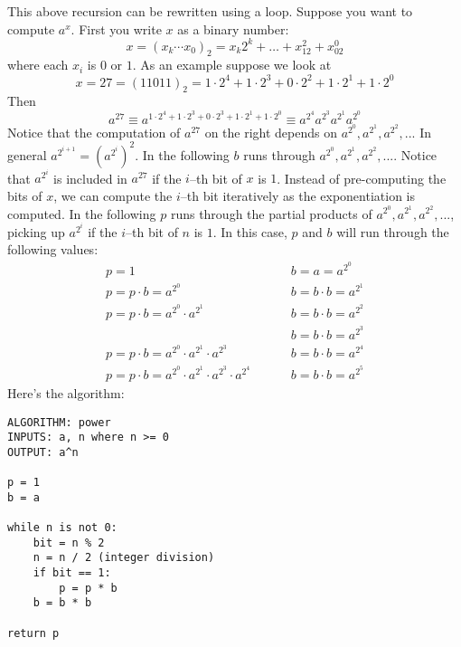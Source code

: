 This above recursion can be rewritten using a loop.
Suppose you want to compute $a^x$.
First you write $x$ as a binary number:
\[
x = (x_k\cdots x_0)_2 = x_k 2^k + \ldots + x_12^2 + x_02^0
\]
where each $x_i$ is $0$ or $1$.
As an example suppose we look at
\[
x = 27 = (11011)_2 =  1 \cdot 2^4 + 1 \cdot 2^3 + 0 \cdot 2^2 + 1 \cdot 2^1 + 1 \cdot 2^0
\]
Then
\[
a^{27} \equiv a^{1 \cdot 2^4 + 1 \cdot 2^3 + 0 \cdot 2^3 + 1 \cdot 2^1 + 1 \cdot 2^0} \equiv a^{2^4}a^{2^3}a^{2^1}a^{2^0}
\]
Notice that the computation of $a^{27}$ on the right
depends on $a^{2^0},a^{2^1},a^{2^2},...$
In general $a^{2^{i+1}} = (a^{2^i})^2$.
In the following $b$ runs through $a^{2^0},a^{2^1},a^{2^2},...$.
Notice that $a^{2^i}$ is included in $a^{27}$ if the $i$--th bit of $x$ is $1$.
Instead of pre-computing the bits of $x$, we can compute the $i$--th bit
iteratively as the exponentiation is computed.
In the following $p$ runs through the partial products of $a^{2^0},a^{2^1},a^{2^2},...$,
picking up $a^{2^i}$ if the $i$--th bit of $n$ is $1$.
In this case, $p$ and $b$ will run through the following values:
\begin{align*}
p = 1                                                         & \hspace{1cm} b = a = a^{2^0} \\
p = p \cdot b = a^{2^0}                                        & \hspace{1cm} b = b \cdot b = a^{2^1}\\
p = p \cdot b = a^{2^0} \cdot a^{2^1}                            & \hspace{1cm} b = b \cdot b = a^{2^2}\\
                                                              & \hspace{1cm} b = b \cdot b = a^{2^3} \\
p = p \cdot b = a^{2^0} \cdot a^{2^1} \cdot a^{2^3}               & \hspace{1cm} b = b \cdot b = a^{2^4} \\
p = p \cdot b = a^{2^0} \cdot a^{2^1} \cdot a^{2^3}  \cdot a^{2^4} & \hspace{1cm} b = b \cdot b = a^{2^5}
\end{align*}
Here's the algorithm:
\begin{Verbatim}[frame=single,fontsize=\footnotesize]
ALGORITHM: power
INPUTS: a, n where n >= 0
OUTPUT: a^n

p = 1
b = a

while n is not 0:
    bit = n % 2
    n = n / 2 (integer division)
    if bit == 1:
        p = p * b
    b = b * b

return p    
\end{Verbatim}

